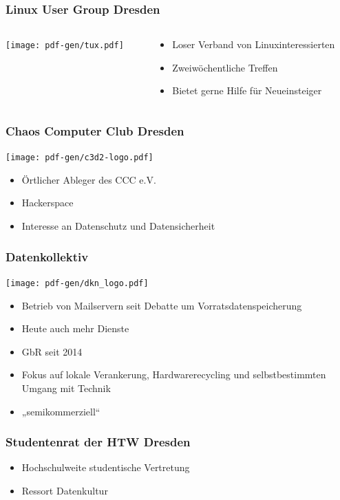 \documentclass[t]{beamer}
\begin{document}
\begin{frame}
  \frametitle{Linux User Group Dresden}
  \begin{columns}
    \begin{column}[T]{0.45\textwidth}
      \texttt{[image: pdf-gen/tux.pdf]}
    \end{column}
    \begin{column}{0.45\textwidth}
      \begin{itemize}
      \item Loser Verband von Linuxinteressierten
      \item Zweiwöchentliche Treffen
      \item Bietet gerne Hilfe für Neueinsteiger
      \end{itemize}
    \end{column}
  \end{columns}
\end{frame}

\begin{frame}
  \frametitle{Chaos Computer Club Dresden}
  \begin{center}
    \texttt{[image: pdf-gen/c3d2-logo.pdf]}
  \end{center}
  \begin{itemize}
  \item Örtlicher Ableger des CCC e.V.
  \item Hackerspace
  \item Interesse an Datenschutz und Datensicherheit
  \end{itemize}
\end{frame}

\begin{frame}
  \frametitle{Datenkollektiv}
  \texttt{[image: pdf-gen/dkn\_logo.pdf]}
  \begin{itemize}
  \item Betrieb von Mailservern seit Debatte um Vorratsdatenspeicherung
  \item Heute auch mehr Dienste
  \item GbR seit 2014
  \item Fokus auf lokale Verankerung, Hardwarerecycling und selbstbestimmten Umgang mit Technik
  \item „semikommerziell“
  \end{itemize}
\end{frame}

\begin{frame}
  \frametitle{Studentenrat der HTW Dresden}
  \begin{itemize}
  \item Hochschulweite studentische Vertretung
  \item Ressort Datenkultur
  \end{itemize}
\end{frame}
\end{document}

